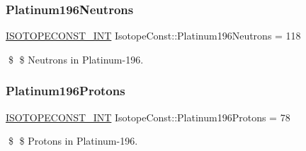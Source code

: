 \subsubsection{\texorpdfstring{Platinum196\+Neutrons}{Platinum196Neutrons}}
{\footnotesize\ttfamily \mbox{\hyperlink{group___isotope_const-_macros_ga5f18360b3e99483a35c32d789e62621c}{I\+S\+O\+T\+O\+P\+E\+C\+O\+N\+S\+T\+\_\+\+I\+NT}} Isotope\+Const\+::\+Platinum196\+Neutrons = 118}

\$ \$ Neutrons in Platinum-\/196. \mbox{\label{group___isotope_const-_platinum-_pt196_ga9f9f5c7262724cef796d6ee08cde7a20}} 
\subsubsection{\texorpdfstring{Platinum196\+Protons}{Platinum196Protons}}
{\footnotesize\ttfamily \mbox{\hyperlink{group___isotope_const-_macros_ga5f18360b3e99483a35c32d789e62621c}{I\+S\+O\+T\+O\+P\+E\+C\+O\+N\+S\+T\+\_\+\+I\+NT}} Isotope\+Const\+::\+Platinum196\+Protons = 78}

\$ \$ Protons in Platinum-\/196. 